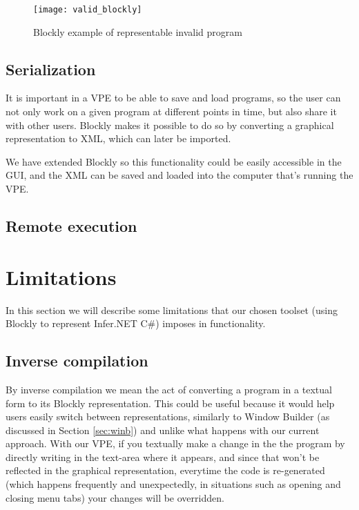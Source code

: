 \begin{figure}[t]
  \begin{center}
    \leavevmode
    \texttt{[image: valid\_blockly]}
    \caption{Blockly example of representable invalid program}
    \label{fig:valid_blockly}
  \end{center}
\end{figure}

\subsection{Serialization}

It is important in a VPE to be able to save and load programs, so the user can
not only work on a given program at different points in time, but also share it
with other users. Blockly makes it possible to do so by converting a graphical
representation to XML, which can later be imported.

We have extended Blockly so this functionality could be easily accessible in the
GUI, and the XML can be saved and loaded into the computer that's running the VPE.

\subsection{Remote execution}

\section{Limitations}

In this section we will describe some limitations that our chosen toolset (using
Blockly to represent Infer.NET C#) imposes in functionality.

\subsection{Inverse compilation}

By inverse compilation we mean the act of converting a program in a textual form
to its Blockly representation. This could be useful because it would help users
easily switch between representations, similarly to Window Builder (as discussed in Section \ref{sec:winb})
and unlike what happens with our current approach.
With our VPE, if you textually make a change in the the program by directly
writing in the text-area where it appears,
and since that won't be reflected in the graphical representation, everytime
the code is re-generated (which happens frequently and unexpectedly, in situations
such as opening and closing menu tabs) your changes will be overridden.

